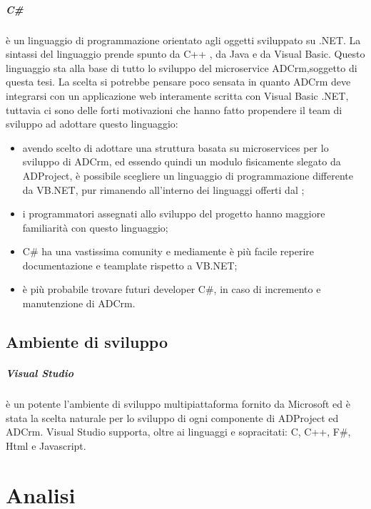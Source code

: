 \documentclass[12pt,a4paper,twoside,openright,english]{book}
\begin{document}
\paragraph{C\#}
è un linguaggio di programmazione orientato agli oggetti sviluppato su .NET.
La sintassi del linguaggio prende spunto da C++ , da Java
e da Visual Basic.
Questo linguaggio sta alla base di tutto lo sviluppo del microservice ADCrm,soggetto di questa tesi. La scelta si potrebbe pensare poco sensata in quanto ADCrm deve integrarsi con un applicazione web interamente scritta con Visual Basic .NET, tuttavia ci sono delle forti motivazioni che hanno fatto propendere il team di sviluppo ad adottare questo linguaggio:
\begin{itemize}
	\itemsep-1em 
	\item avendo scelto di adottare una struttura basata su microservices per lo sviluppo di ADCrm, ed essendo quindi un modulo fisicamente slegato da ADProject, è possibile scegliere un linguaggio di programmazione differente da VB.NET, pur rimanendo all'interno dei linguaggi offerti dal ;
	\item i programmatori assegnati allo sviluppo del progetto hanno maggiore familiarità con questo linguaggio;
	\item C\# ha una vastissima comunity e mediamente è più facile reperire documentazione e teamplate rispetto a VB.NET;
	\item è più probabile trovare futuri developer C\#, in caso di incremento e manutenzione di ADCrm.	
\end{itemize}

\section{Ambiente di sviluppo}
\paragraph{Visual Studio}
 è un potente l'ambiente di sviluppo multipiattaforma fornito da Microsoft ed è stata la scelta naturale per lo sviluppo di ogni componente di ADProject ed ADCrm.
Visual Studio supporta, oltre ai linguaggi e  sopracitati: C, C++, F\#, Html e Javascript. 

\chapter{Analisi}\label{analisi}
\end{document}
